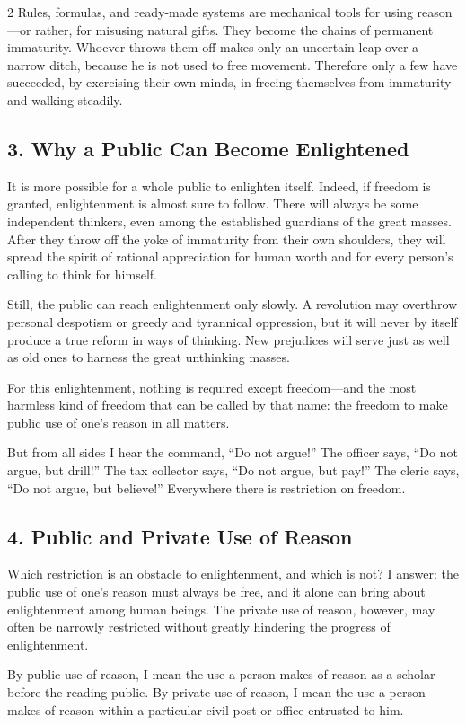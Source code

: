 \documentclass[12pt]{article}
\begin{document}
\begin{multicols}{2}
Rules, formulas, and ready-made systems are mechanical tools for using reason---or rather, for misusing natural gifts. They become the chains of permanent immaturity. Whoever throws them off makes only an uncertain leap over a narrow ditch, because he is not used to free movement. Therefore only a few have succeeded, by exercising their own minds, in freeing themselves from immaturity and walking steadily.

\subsection*{3. Why a Public Can Become Enlightened}
It is more possible for a whole public to enlighten itself. Indeed, if freedom is granted, enlightenment is almost sure to follow. There will always be some independent thinkers, even among the established guardians of the great masses. After they throw off the yoke of immaturity from their own shoulders, they will spread the spirit of rational appreciation for human worth and for every person's calling to think for himself.

Still, the public can reach enlightenment only slowly. A revolution may overthrow personal despotism or greedy and tyrannical oppression, but it will never by itself produce a true reform in ways of thinking. New prejudices will serve just as well as old ones to harness the great unthinking masses.

For this enlightenment, nothing is required except freedom---and the most harmless kind of freedom that can be called by that name: the freedom to make public use of one's reason in all matters.

But from all sides I hear the command, ``Do not argue!'' The officer says, ``Do not argue, but drill!'' The tax collector says, ``Do not argue, but pay!'' The cleric says, ``Do not argue, but believe!'' Everywhere there is restriction on freedom.

\subsection*{4. Public and Private Use of Reason}
Which restriction is an obstacle to enlightenment, and which is not? I answer: the public use of one's reason must always be free, and it alone can bring about enlightenment among human beings. The private use of reason, however, may often be narrowly restricted without greatly hindering the progress of enlightenment.

By public use of reason, I mean the use a person makes of reason as a scholar before the reading public. By private use of reason, I mean the use a person makes of reason within a particular civil post or office entrusted to him.


\end{multicols}
\end{document}
